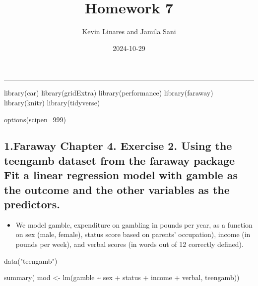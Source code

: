 \documentclass[
  letterpaper,
  DIV=11,
  numbers=noendperiod]{scrartcl}
\title{Homework 7}
\author{Kevin Linares and Jamila Sani}
\date{2024-10-29}
\newenvironment{Shaded}{\begin{snugshade}}{\end{snugshade}}
\newcommand{\AttributeTok}[1]{\textcolor[rgb]{0.40,0.45,0.13}{#1}}
\newcommand{\DecValTok}[1]{\textcolor[rgb]{0.68,0.00,0.00}{#1}}
\newcommand{\FunctionTok}[1]{\textcolor[rgb]{0.28,0.35,0.67}{#1}}
\newcommand{\NormalTok}[1]{\textcolor[rgb]{0.00,0.23,0.31}{#1}}
\newcommand{\OtherTok}[1]{\textcolor[rgb]{0.00,0.23,0.31}{#1}}
\newcommand{\SpecialCharTok}[1]{\textcolor[rgb]{0.37,0.37,0.37}{#1}}
\newcommand{\StringTok}[1]{\textcolor[rgb]{0.13,0.47,0.30}{#1}}
\providecommand{\tightlist}{%
  \setlength{\itemsep}{0pt}\setlength{\parskip}{0pt}}\usepackage{longtable,booktabs,array}
\begin{document}
\maketitle

\begin{center}\rule{0.5\linewidth}{0.5pt}\end{center}

\begin{Shaded}
\begin{Highlighting}[]
\FunctionTok{library}\NormalTok{(car)}
\FunctionTok{library}\NormalTok{(gridExtra)}
\FunctionTok{library}\NormalTok{(performance)}
\FunctionTok{library}\NormalTok{(faraway)}
\FunctionTok{library}\NormalTok{(knitr)}
\FunctionTok{library}\NormalTok{(tidyverse)}

\FunctionTok{options}\NormalTok{(}\AttributeTok{scipen=}\DecValTok{999}\NormalTok{)}
\end{Highlighting}
\end{Shaded}

\subsection{1.Faraway Chapter 4. Exercise 2. Using the teengamb dataset
from the faraway package Fit a linear regression model with gamble as
the outcome and the other variables as the
predictors.}\label{faraway-chapter-4.-exercise-2.-using-the-teengamb-dataset-from-the-faraway-package-fit-a-linear-regression-model-with-gamble-as-the-outcome-and-the-other-variables-as-the-predictors.}

\begin{itemize}
\tightlist
\item
  We model gamble, expenditure on gambling in pounds per year, as a
  function on sex (male, female), status score based on parents'
  occupation), income (in pounds per week), and verbal scores (in words
  out of 12 correctly defined).
\end{itemize}

\begin{Shaded}
\begin{Highlighting}[]
\FunctionTok{data}\NormalTok{(}\StringTok{"teengamb"}\NormalTok{)}
\end{Highlighting}
\end{Shaded}

\begin{Shaded}
\begin{Highlighting}[]
\FunctionTok{summary}\NormalTok{(}
\NormalTok{  mod }\OtherTok{\textless{}{-}} \FunctionTok{lm}\NormalTok{(gamble }\SpecialCharTok{\textasciitilde{}}\NormalTok{ sex }\SpecialCharTok{+}\NormalTok{ status }\SpecialCharTok{+}\NormalTok{ income }\SpecialCharTok{+}\NormalTok{ verbal, teengamb))}
\end{Highlighting}
\end{Shaded}
\end{document}
